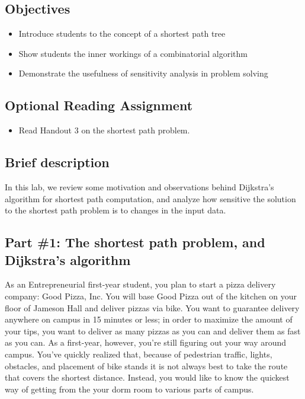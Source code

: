 \documentclass[twoside]{article}%
\begin{document}

\noindent
\subsection*{Objectives}
\begin{itemize}
\item   Introduce students to the concept of a shortest path tree
\item   Show students the inner workings of a combinatorial algorithm
\item   Demonstrate the usefulness of sensitivity analysis in problem solving
\end{itemize}

\subsection*{Optional Reading Assignment}
\begin{itemize}
\item
Read Handout 3 on the shortest path problem.
\end{itemize}


\subsection*{Brief description}
In this lab, we review some motivation and observations behind Dijkstra's algorithm for shortest path computation, and analyze how sensitive the solution to the shortest path problem is to changes in the input data.

\newpage

\subsection*{Part \#1: The shortest path problem, and Dijkstra's algorithm}

As an Entrepreneurial first-year student, you plan to start a pizza delivery company: Good Pizza, Inc.  You will base Good Pizza out of the kitchen on your floor of Jameson Hall and deliver pizzas via bike.  You want to guarantee delivery anywhere on campus in 15 minutes or less; in order to maximize the amount of your tips, you want to deliver as many pizzas as you can and deliver
them as fast as you can.  As a first-year, however, you're still figuring out your way around campus.  You've quickly realized that, because of pedestrian traffic, lights, obstacles, and  placement of bike stands  it is not always best to take the route that covers the shortest distance.  Instead, you would like to know the
quickest way of getting from the your dorm room to various parts of campus.
\end{document}
